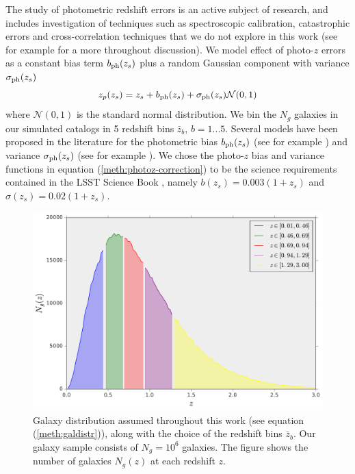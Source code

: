 \documentclass[reprint,aps,prd,superscriptaddress,showkeys,showpacs]{revtex4-1}
\begin{document}
The study of photometric redshift errors is an active subject of research, and includes investigation of techniques such as spectroscopic calibration, catastrophic errors and cross-correlation techniques that we do not explore in this work (see for example \citep{HuTomo} for a more throughout discussion). We model effect of photo-$z$ errors as a constant bias term $b_{\rm ph}(z_s)$ plus a random Gaussian component with variance $\sigma_{\rm ph}(z_s)$
\begin{equation}
\label{meth:photoz-correction}
z_p(z_s) = z_s + b_{\rm ph}(z_s) + \sigma_{\rm ph}(z_s)\mathcal{N}(0,1)   
\end{equation}
%
where $\mathcal{N}(0,1)$ is the standard normal distribution. We bin the $N_g$ galaxies in our simulated catalogs in 5 redshift bins $\bar{z}_b$, $b=1...5$. Several models have been proposed in the literature for the photometric bias $b_{\rm ph}(z_s)$ (see for example \citep{Huterer2006}) and variance $\sigma_{\rm ph}(z_s)$ (see for example \citep{LSSTSciBook}). We chose the photo-$z$ bias and variance functions in equation (\ref{meth:photoz-correction}) to be the science requirements contained in the LSST Science Book \citep{LSSTSciBook}, namely $b(z_s)=0.003(1+z_s)$ and $\sigma(z_s)=0.02(1+z_s)$. 

\begin{figure}
\includegraphics[scale=0.3]{Figures/galdistr.pdf}
\caption{Galaxy distribution assumed throughout this work (see equation (\ref{meth:galdistr})), along with the choice of the redshift bins $\bar{z}_b$. Our galaxy sample consists of $N_g=10^6$ galaxies. The figure shows the number of galaxies $N_g(z)$ at each redshift $z$.}
\label{fig:galdistr}
\end{figure}
\end{document}
